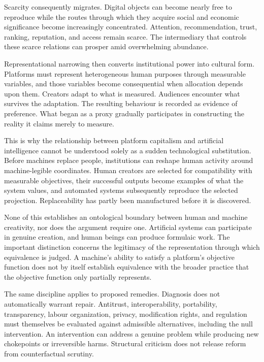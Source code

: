 \documentclass[11pt]{article}
\begin{document}
Scarcity consequently migrates. Digital objects can become nearly free to reproduce while the routes through which they acquire social and economic significance become increasingly concentrated. Attention, recommendation, trust, ranking, reputation, and access remain scarce. The intermediary that controls these scarce relations can prosper amid overwhelming abundance.

Representational narrowing then converts institutional power into cultural form. Platforms must represent heterogeneous human purposes through measurable variables, and those variables become consequential when allocation depends upon them. Creators adapt to what is measured. Audiences encounter what survives the adaptation. The resulting behaviour is recorded as evidence of preference. What began as a proxy gradually participates in constructing the reality it claims merely to measure.

This is why the relationship between platform capitalism and artificial intelligence cannot be understood solely as a sudden technological substitution. Before machines replace people, institutions can reshape human activity around machine-legible coordinates. Human creators are selected for compatibility with measurable objectives, their successful outputs become examples of what the system values, and automated systems subsequently reproduce the selected projection. Replaceability has partly been manufactured before it is discovered.

None of this establishes an ontological boundary between human and machine creativity, nor does the argument require one. Artificial systems can participate in genuine creation, and human beings can produce formulaic work. The important distinction concerns the legitimacy of the representation through which equivalence is judged. A machine's ability to satisfy a platform's objective function does not by itself establish equivalence with the broader practice that the objective function only partially represents.

The same discipline applies to proposed remedies. Diagnosis does not automatically warrant repair. Antitrust, interoperability, portability, transparency, labour organization, privacy, modification rights, and regulation must themselves be evaluated against admissible alternatives, including the null intervention. An intervention can address a genuine problem while producing new chokepoints or irreversible harms. Structural criticism does not release reform from counterfactual scrutiny.
\end{document}
